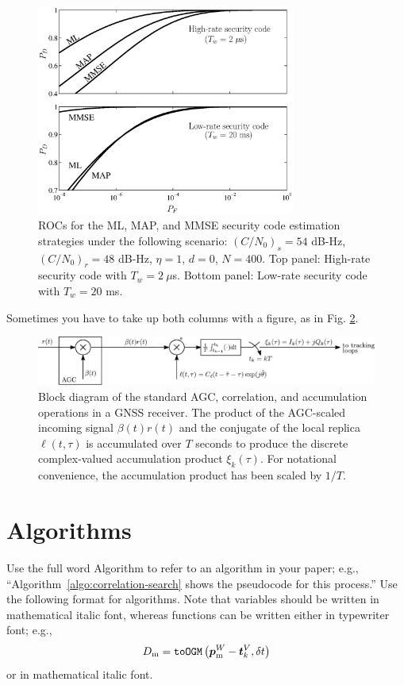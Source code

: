 \documentclass[10pt,journal,twocolumn]{IEEEtran} %
\newcommand{\cnr}{C/N_0}
\begin{document}
\begin{figure}[t]
\centering
\includegraphics[width = 8.5cm]
{figs/rocplot1}
\caption{ROCs for the ML, MAP, and MMSE security code estimation strategies
  under the following scenario: $(\cnr)_s = 54$ dB-Hz,
  $(\cnr)_r = 48$ dB-Hz, $\eta = 1$, $d = 0$, $N = 400$. Top panel: High-rate
  security code with $T_w = 2~ \mu$s.  Bottom panel: Low-rate security code
  with $T_w = 20$ ms.}
\label{fig:rocplot1}
\end{figure}

Sometimes you have to take up both columns with a figure, as in
Fig. \ref{fig:rx-model}.

\begin{figure}[t]
  \centering
  \includegraphics[width=\textwidth]{figs/correlation}
  \caption{Block diagram of the standard AGC, correlation, and accumulation
    operations in a GNSS receiver. The product of the AGC-scaled incoming
    signal $\beta(t)r(t)$ and the conjugate of the local replica
    $\ell(t,\tau)$ is accumulated over $T$ seconds to produce the discrete
    complex-valued accumulation product $\xi_k(\tau)$. For notational
    convenience, the accumulation product has been scaled by $1/T$.}
  \label{fig:rx-model}
\end{figure}

\section{Algorithms}
Use the full word Algorithm to refer to an algorithm in your paper; e.g.,
``Algorithm~\ref{algo:correlation-search} shows the pseudocode for this
process.'' Use the following format for algorithms. Note that variables should
be written in mathematical italic font, whereas functions can be written either
in typewriter font; e.g.,
\[D_{\text m} = \texttt{toOGM} \left( \bm{p}_{\text m}^{W} - \bm{t}_k^{V},
    \delta t \right)\] or in mathematical italic font.
\end{document}
